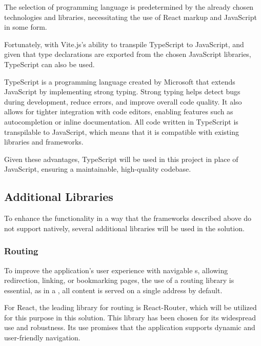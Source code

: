 The selection of programming language is predetermined by the already chosen technologies and libraries, necessitating the use of React markup and JavaScript in some form.

Fortunately, with Vite.js's ability to transpile TypeScript to JavaScript, and given that type declarations are exported from the chosen JavaScript libraries, TypeScript can also be used.~\cite{Said2023}

TypeScript is a programming language created by Microsoft that extends JavaScript by implementing strong typing. Strong typing helps detect bugs during development, reduce errors, and improve overall code quality. It also allows for tighter integration with code editors, enabling features such as autocompletion or inline documentation. All code written in TypeScript is transpilable to JavaScript, which means that it is compatible with existing libraries and frameworks.~\cite{TypeScript}

Given these advantages, TypeScript will be used in this project in place of JavaScript, ensuring a maintainable, high-quality codebase.


\subsection{Additional Libraries}

To enhance the functionality in a way that the frameworks described above do not support natively, several additional libraries will be used in the solution.

\subsubsection{Routing} \label{section:react-router}

To improve the application's user experience with navigable s, allowing redirection, linking, or bookmarking pages, the use of a routing library is essential, as in a , all content is served on a single address by default.

For React, the leading library for routing is React-Router, which will be utilized for this purpose in this solution. This library has been chosen for its widespread use and robustness. Its use promises that the application supports dynamic and user-friendly navigation.~\cite{Ganatra2018}


